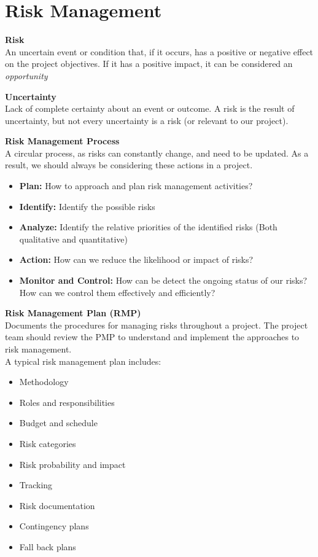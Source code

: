\documentclass[a4paper,10pt]{article}
\begin{document}
\section*{Risk Management}
\begin{shaded}
	\noindent \textcolor{BlueGreen}{\textbf{Risk}} \\
	An uncertain event or condition that, if it occurs, has a positive or negative effect on the project objectives. If it has a positive impact, it can be considered an \emph{opportunity}
\end{shaded}
\begin{shaded}
	\noindent \textcolor{BlueGreen}{\textbf{Uncertainty}} \\
	Lack of complete certainty about an event or outcome. A risk is the result of uncertainty, but not every uncertainty is a risk (or relevant to our project). 
\end{shaded}
\textcolor{BlueGreen}{\textbf{Risk Management Process}} \\
A circular process, as risks can constantly change, and need to be updated. As a result, we should always be considering these actions in a project. 
\begin{itemize}
	\item \textbf{Plan:} How to approach and plan risk management activities? 
	\item \textbf{Identify:} Identify the possible risks  
	\item \textbf{Analyze:} Identify the relative priorities of the identified risks (Both qualitative and quantitative)  
	\item \textbf{Action:} How can we reduce the likelihood or impact of risks? 
	\item \textbf{Monitor and Control:} How can be detect the ongoing status of our risks? How can we control them effectively and efficiently? \\
\end{itemize}
\textcolor{BlueGreen}{\textbf{Risk Management Plan (RMP)}} \\
Documents the procedures for managing risks throughout a project. The project team should review the PMP to understand and implement the approaches to risk management. \\
A typical risk management plan includes:
\begin{itemize}
	\item Methodology 
	\item Roles and responsibilities 
	\item Budget and schedule 
	\item Risk categories 
	\item Risk probability and impact 
	\item Tracking 
	\item Risk documentation 
	\item Contingency plans 
	\item Fall back plans
\end{itemize}
\end{document}

